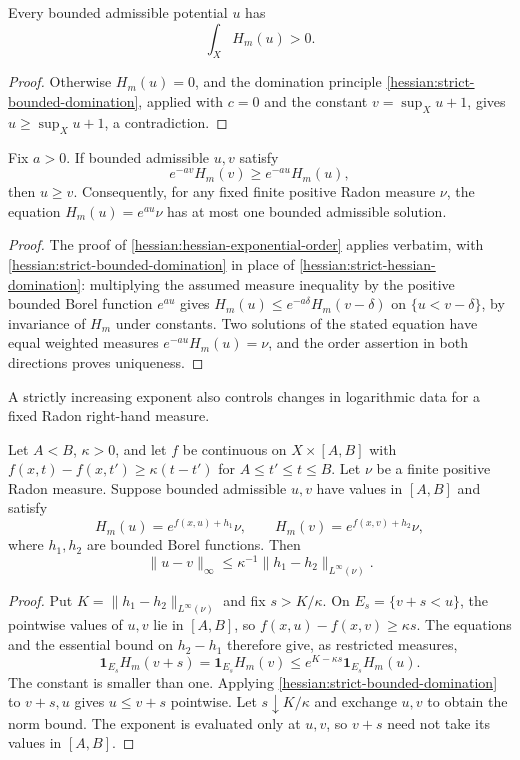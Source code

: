 \begin{proposition}\label{hessian:bounded-nonvanishing}
Every bounded admissible potential $u$ has
\[
 \int_X H_m(u)>0.
\]
\end{proposition}
\begin{proof}
Otherwise $H_m(u)=0$, and the domination principle
\cref{hessian:strict-bounded-domination}, applied with $c=0$ and the
constant $v=\sup_Xu+1$, gives $u\geq\sup_Xu+1$, a contradiction.
\end{proof}

\begin{corollary}\label{hessian:proper-bounded-uniqueness}
Fix $a>0$.
If bounded admissible $u,v$ satisfy
\[
 e^{-av}H_m(v)\geq e^{-au}H_m(u),
\]
then $u\geq v$. Consequently, for any fixed finite positive Radon
measure $\nu$, the equation $H_m(u)=e^{au}\nu$ has at most one
bounded admissible solution.
\end{corollary}
\begin{proof}
The proof of \cref{hessian:hessian-exponential-order} applies verbatim,
with \cref{hessian:strict-bounded-domination} in place of
\cref{hessian:strict-hessian-domination}: multiplying the assumed
measure inequality by the positive bounded Borel function $e^{au}$
gives $H_m(u)\leq e^{-a\delta}H_m(v-\delta)$ on $\{u<v-\delta\}$, by
invariance of $H_m$ under constants. Two solutions of the stated
equation have equal weighted measures $e^{-au}H_m(u)=\nu$, and the
order assertion in both directions proves uniqueness.
\end{proof}

A strictly increasing exponent also controls changes in logarithmic
data for a fixed Radon right-hand measure.

\begin{proposition}\label{hessian:proper-bounded-stability}
Let $A<B$, $\kappa>0$, and let $f$ be continuous on $X\times[A,B]$
with $f(x,t)-f(x,t')\geq\kappa(t-t')$ for $A\leq t'\leq t\leq B$. Let
$\nu$ be a finite positive Radon measure.
Suppose bounded admissible $u,v$ have values in $[A,B]$ and satisfy
\[
 H_m(u)=e^{f(x,u)+h_1}\nu,\qquad
 H_m(v)=e^{f(x,v)+h_2}\nu,
\]
where $h_1,h_2$ are bounded Borel functions. Then
\[
 \|u-v\|_\infty
            \leq\kappa^{-1}\|h_1-h_2\|_{L^\infty(\nu)}.
\]
\end{proposition}
\begin{proof}
Put $K=\|h_1-h_2\|_{L^\infty(\nu)}$ and fix $s>K/\kappa$.
On $E_s=\{v+s<u\}$, the pointwise values of $u,v$ lie in $[A,B]$,
so $f(x,u)-f(x,v)\geq\kappa s$.
The equations and the essential bound on $h_2-h_1$ therefore give,
as restricted measures,
\[
 \mathbf1_{E_s}H_m(v+s)
 =\mathbf1_{E_s}H_m(v)
 \leq e^{K-\kappa s}\mathbf1_{E_s}H_m(u).
\]
The constant is smaller than one. Applying
\cref{hessian:strict-bounded-domination} to $v+s,u$ gives
$u\leq v+s$ pointwise. Let $s\downarrow K/\kappa$ and exchange
$u,v$ to obtain the norm bound. The exponent is evaluated only
at $u,v$, so $v+s$ need not take its values in $[A,B]$.
\end{proof}


